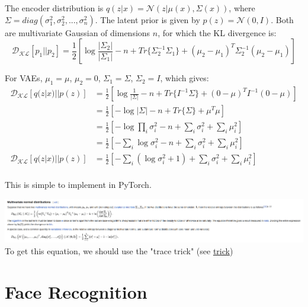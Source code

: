 The encoder distribution is $q(z|x) = \mathcal{N}(z|\mu(x),\Sigma(x))$, where $\Sigma=diag(\sigma_1^2, \sigma_2^2, ..., \sigma_n^2)$.
The latent prior is given by $p(z) = \mathcal{N}(0, I)$.
Both are multivariate Gaussian of dimensions $n$, for which the KL divergence is:
\begin{equation}
    \mathcal{D_{KL}}[p_1||p_2] = \frac{1}{2} \left[ \log \frac{|\Sigma_2|}{|\Sigma_1|} - n + Tr\{\Sigma_2^{-1}\Sigma_1\} + (\mu_2 - \mu_1)^T \Sigma_2^{-1} (\mu_2-\mu_1) \right]
\end{equation}

For VAEs, $\mu_1 = \mu$, $\mu_2 = 0$, $\Sigma_1 = \Sigma$, $\Sigma_2 = I$, which gives:
\begin{equation}
    \begin{split}
        \mathcal{D_{KL}}[q(z|x)||p(z)] &= \frac{1}{2} \left[ \log \frac{1}{|\Sigma|} - n + Tr\{I^{-1}\Sigma\} + (0 - \mu)^T I^{-1} (0-\mu) \right] \\
        &= \frac{1}{2} \left[ -\log |\Sigma| - n + Tr\{\Sigma\} + \mu^T\mu \right] \\
        &= \frac{1}{2} \left[ -\log \prod_i \sigma_i^2 - n + \sum_i \sigma_i^2 + \sum_i \mu_i^2 \right] \\
        &= \frac{1}{2} \left[ -\sum_i \log\sigma_i^2 - n + \sum_i \sigma_i^2 + \sum_i \mu_i^2 \right] \\
        \mathcal{D_{KL}}[q(z|x)||p(z)] &= \frac{1}{2} \left[ -\sum_i(\log\sigma_i^2 + 1) + \sum_i \sigma_i^2 + \sum_i \mu_i^2 \right] \\
    \end{split}
\end{equation}

This is simple to implement in PyTorch.

\includegraphics[scale=1]{content/KL_gaussians.png}
To get this equation, we should use the "trace trick" (see \href{https://en.wikipedia.org/wiki/Estimation_of_covariance_matrices#The_trace_of_a_1_.C3.97_1_matrix}{trick})



\section{Face Recognition}

